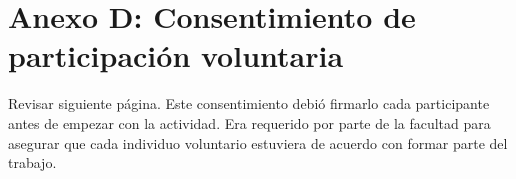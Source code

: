 \chapter*{Anexo D: Consentimiento de participación voluntaria}\label{AnexoD}

Revisar siguiente página. Este consentimiento debió firmarlo cada participante antes de empezar con la actividad. Era requerido por parte de la facultad para asegurar que cada individuo voluntario estuviera de acuerdo con formar parte del trabajo.


\begin{figure}[h]
   \centering
\end{figure}

\restoregeometry